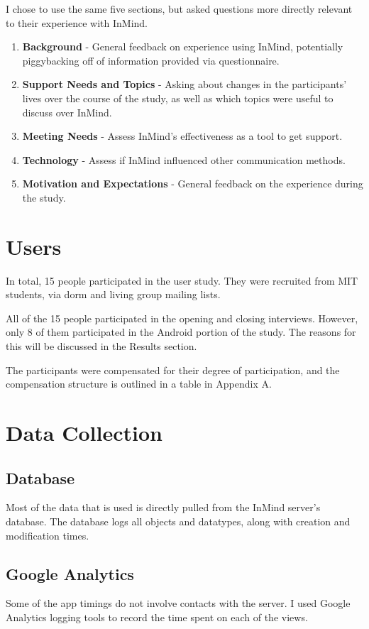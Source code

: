   I chose to use the same five sections,
  but asked questions more directly relevant to their experience with InMind.
  \begin{enumerate}
  \item \textbf{Background} - 
  General feedback on experience using InMind,
  potentially piggybacking off of information provided via questionnaire.
  \item \textbf{Support Needs and Topics} - 
  Asking about changes in the participants' lives over the course of the study,
  as well as which topics were useful to discuss over InMind.
  \item \textbf{Meeting Needs} - 
  Assess InMind's effectiveness as a tool to get support.
  \item \textbf{Technology} - 
  Assess if InMind influenced other communication methods.
  \item \textbf{Motivation and Expectations} - 
  General feedback on the experience during the study.
  \end{enumerate}

\section{Users}
  In total, 15 people participated in the user study.
  They were recruited from MIT students,
  via dorm and living group mailing lists.

  All of the 15 people participated in the opening and closing interviews.
  However, only 8 of them participated in the Android portion of the study.
  The reasons for this will be discussed in the Results section.

  The participants were compensated for their degree of participation,
  and the compensation structure is outlined in a table in Appendix A.

\section{Data Collection}
  \subsection{Database}
    Most of the data that is used is directly pulled from
    the InMind server's database.
    The database logs all objects and datatypes,
    along with creation and modification times.

  \subsection{Google Analytics}
    Some of the app timings do not involve contacts with the server.
    I used Google Analytics logging tools to record the time spent
    on each of the views.
